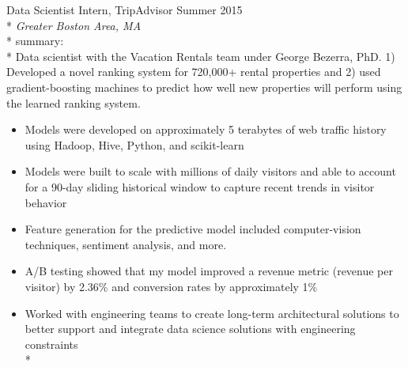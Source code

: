 \documentclass[]{friggeri-cv} %
\begin{document}
\iftoggle{cv}{
\section{research/work experience}
}{
\section{selected research/work experience}
}
\begin{description} \itemsep1pt \parskip0pt 
  \item {\largeheaderfont Data Scientist Intern, TripAdvisor} \hfill
    {\smallheaderfont Summer 2015}\\*
    {\footnotesize \emph{Greater Boston Area, MA}} \\*
    {\smallheaderfont summary}: \\*
    Data scientist with the Vacation Rentals team under George Bezerra, PhD.
    1) Developed a novel ranking system for 720,000+
    rental properties and 2) used gradient-boosting machines to predict how
    well new properties will perform using the learned ranking system.
    \begin{itemize} \itemsep1pt \parskip0pt 
      \item Models were developed on approximately 5 terabytes of web traffic
        history using Hadoop, Hive, Python, and scikit-learn
      \item Models were built to scale with millions of daily visitors
            and able to account for a 90-day sliding
            historical window to capture recent trends in visitor behavior
      \item Feature generation for the predictive model included computer-vision
            techniques, sentiment analysis, and more.
      \item A/B testing showed that my model improved a revenue metric (revenue per
            visitor) by 2.36\% and conversion rates by approximately 1\%
      \item Worked with engineering teams to create long-term architectural
            solutions to better support and integrate data science solutions with
            engineering constraints
    \\*
    \end{itemize}


\end{description}
\end{document}
